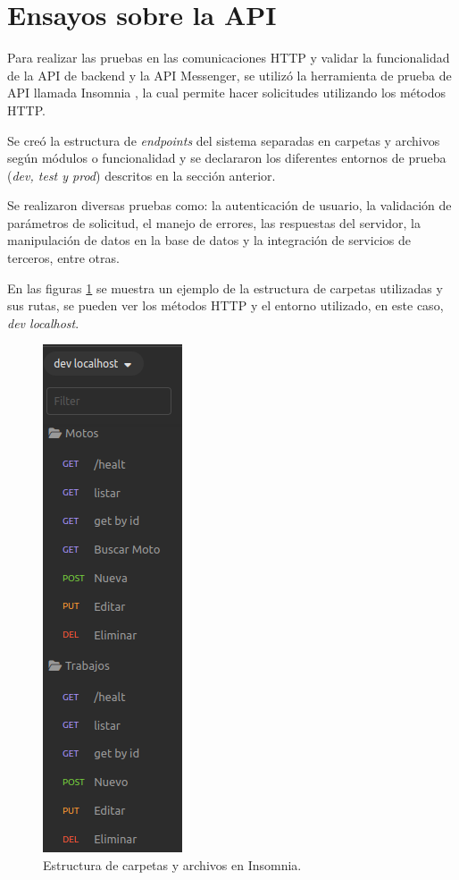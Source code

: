 \section{Ensayos sobre la API}
\label{sec:ensayos-api}

Para realizar las pruebas en las comunicaciones HTTP y validar la funcionalidad de la API de backend y la API Messenger, se utilizó la herramienta de prueba de API llamada Insomnia \cite{insomnia}, la cual permite hacer solicitudes utilizando los métodos HTTP.

Se creó la estructura de \textit{endpoints} del sistema separadas en carpetas y archivos según módulos o funcionalidad y se declararon los diferentes entornos de prueba (\textit{dev, test y prod}) descritos en la sección anterior. 

Se realizaron diversas pruebas como: la autenticación de usuario, la validación de parámetros de solicitud, el manejo de errores, las respuestas del servidor, la manipulación de datos en la base de datos y la integración de servicios de terceros, entre otras.

En las figuras \ref{fig:insomnia-carpetas} se muestra un ejemplo de la estructura de carpetas utilizadas y sus rutas, se pueden ver los métodos HTTP y el entorno utilizado, en este caso, \textit{dev localhost}.

\begin{figure}[H]
	\centering
	\includegraphics[scale=.60]{./Figures/insomnia-carpetas3.png}
	\caption{Estructura de carpetas y archivos en Insomnia.}
	\label{fig:insomnia-carpetas}
\end{figure}
  
